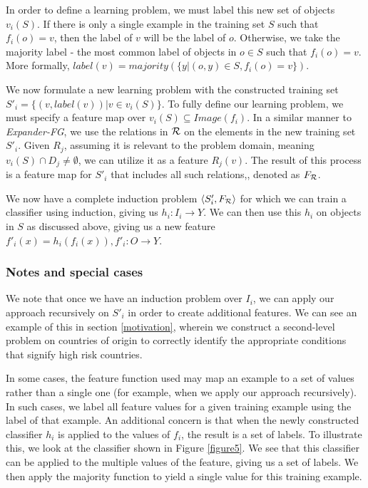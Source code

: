 \documentclass[twoside,11pt]{article}
\theoremstyle{definition}
\begin{document}
In order to define a learning problem, we must label this new set of objects $v_i(S)$. If there is only a single example in the training set $S$ such that $f_i(o)=v$, then the label of $v$ will be the label of $o$. Otherwise, we take the majority label - the most common label of objects in $o\in S$ such that $f_i(o)=v$. More formally, $label(v)=majority(\{y|(o,y)\in S, f_i(o)=v\})$.
 
We now formulate a new learning problem with the constructed training set
$S'_i = \{ (v, label(v)) | v \in v_i(S) \}$.
To fully define our learning problem, we must specify a feature map over $v_i(S)\subseteq Image(f_i)$. In a similar manner to \emph{Expander-FG}, we use the relations in ${\cal R}$ on the elements in the new training set $S'_i$.
Given $R_j$, assuming it is relevant to the problem domain, meaning $v_i(S)\cap D_j\neq\emptyset$, we can utilize it as a feature $R_j(v)$. 
The result of this process is a feature map for $S'_i$ that includes all such relations,, denoted as $F_{\cal R}$. %

We now have a complete induction problem $\langle S'_i,F_{\cal R} \rangle$ for which we can train a classifier using induction, giving us $h_i:I_i\rightarrow Y$. We can then use this $h_i$ on objects in $S$ as discussed above, giving us a new feature $f'_{i}(x)=h_{i}(f_{i}(x)), f'_{i}:O\rightarrow Y$. 

\subsubsection{Notes and special cases}

We note that once we have an induction problem over $I_i$, we can apply our approach recursively on $S'_i$ in order to create additional features. We can see an example of this in section \ref{motivation}, wherein we construct a second-level problem on countries of origin to correctly identify the appropriate conditions that signify high risk countries.

 In some cases, the feature function used may map an example to a set of values rather than a single one (for example, when we apply our approach recursively).
 In such cases, we label all feature values for a given training example using the label of that example.
 An additional concern is that when the newly constructed classifier $h_i$ is applied to the values of $f_i$, the result is a set of labels. To illustrate this, we look at the classifier shown in Figure \ref{figure5}. We see that this classifier can be applied to the multiple values of the feature, giving us a set of labels. We then apply the majority function to yield a single value for this training example.
\end{document}
